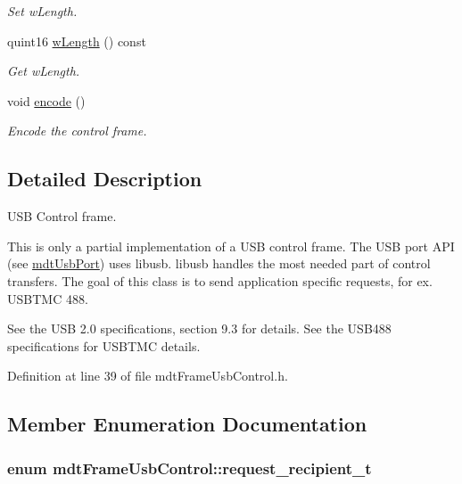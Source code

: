 \begin{DoxyCompactItemize}
\begin{DoxyCompactList}\small\item\em Set wLength. \end{DoxyCompactList}\item 
\hypertarget{classmdt_frame_usb_control_a4c69a912c9ef404fb5f019698d676e52}{
quint16 \hyperlink{classmdt_frame_usb_control_a4c69a912c9ef404fb5f019698d676e52}{wLength} () const }
\label{classmdt_frame_usb_control_a4c69a912c9ef404fb5f019698d676e52}

\begin{DoxyCompactList}\small\item\em Get wLength. \end{DoxyCompactList}\item 
void \hyperlink{classmdt_frame_usb_control_af60cb9e9fd8cb55fc44d696fce0331c0}{encode} ()
\begin{DoxyCompactList}\small\item\em Encode the control frame. \end{DoxyCompactList}\end{DoxyCompactItemize}


\subsection{Detailed Description}
USB Control frame. 

This is only a partial implementation of a USB control frame. The USB port API (see \hyperlink{classmdt_usb_port}{mdtUsbPort}) uses libusb. libusb handles the most needed part of control transfers. The goal of this class is to send application specific requests, for ex. USBTMC 488.

See the USB 2.0 specifications, section 9.3 for details. See the USB488 specifications for USBTMC details. 

Definition at line 39 of file mdtFrameUsbControl.h.



\subsection{Member Enumeration Documentation}
\hypertarget{classmdt_frame_usb_control_aaf1f08b1b5e47ab18426800ed0accbde}{
\subsubsection[{request\_\-recipient\_\-t}]{\setlength{\rightskip}{0pt plus 5cm}enum {\bf mdtFrameUsbControl::request\_\-recipient\_\-t}}}
\label{classmdt_frame_usb_control_aaf1f08b1b5e47ab18426800ed0accbde}


